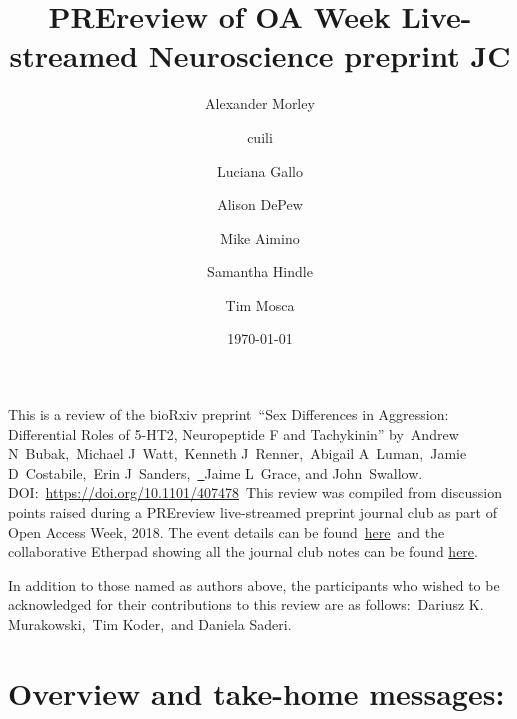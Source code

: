 \documentclass[10pt]{article}
\renewenvironment{abstract}
  {{\bfseries\noindent{\abstractname}\par\nobreak}\footnotesize}
  {\bigskip}
\begin{document}
\title{PREreview of OA Week Live-streamed Neuroscience preprint JC}



\author[1]{Alexander Morley}%
\author[2]{cuili }%
\author[3]{Luciana Gallo}%
\author[4]{Alison DePew}%
\author[5]{Mike Aimino}%
\author[4]{Samantha Hindle}%
\author[5]{Tim Mosca}%
%
%
%
%
%


\vspace{-1em}



  \date{\today}


\begingroup
\let\center\flushleft
\let\endcenter\endflushleft
\maketitle
\endgroup





\begin{abstract}
This is a review of the bioRxiv preprint~``Sex Differences in
Aggression: Differential Roles of 5-HT2, Neuropeptide F and Tachykinin''
by~Andrew N~Bubak,~Michael J~Watt,~Kenneth J~Renner,~Abigail
A~Luman,~Jamie D~Costabile,~Erin
J~Sanders,~\href{http://orcid.org/0000-0002-8563-9182}{~}Jaime L~Grace,
and John~Swallow. DOI:~\url{https://doi.org/10.1101/407478}~This review
was compiled from discussion points raised during a PREreview
live-streamed preprint journal club as part of Open Access Week, 2018.
The event details can be
found~\href{https://prereview.org/users/153686/articles/325778-prereview-plos-open-access-week-preprint-journal-club-information}{here}~and
the collaborative Etherpad showing all the journal club notes can be
found
\href{https://etherpad.net/p/NeuroscienceLiveStreamedPREJC}{here}.~

\par\null

In addition to those named as authors above, the participants who wished
to be acknowledged for their contributions to this review are as
follows:~Dariusz K. Murakowski,~Tim Koder,~and Daniela Saderi.%
\end{abstract}%




\par\null

\section*{Overview and take-home
messages:}
\end{document}
